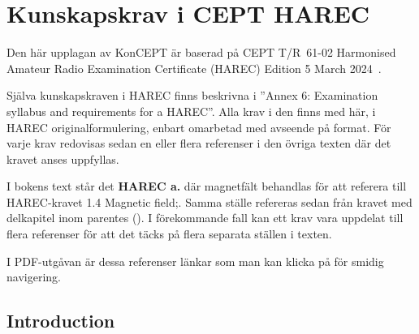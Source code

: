 \chapter{Kunskapskrav i CEPT HAREC}
\label{CEPT HAREC}

\noindent
Den här upplagan av KonCEPT är baserad på CEPT T/R~61-02 Harmonised Amateur
Radio Examination Certificate (HAREC) Edition 5 March 2024~\cite{TR6102}.

Själva kunskapskraven i HAREC finns beskrivna i
''Annex 6: Examination syllabus and requirements for a HAREC''.
Alla krav i den finns med här, i HAREC originalformulering, enbart omarbetad
med avseende på format.
För varje krav redovisas sedan en eller flera referenser i den övriga texten
där det kravet anses uppfyllas.

I bokens text står det \textbf{HAREC a.} där magnetfält
behandlas för att referera till HAREC-kravet 1.4 Magnetic field;.
Samma ställe refereras sedan från kravet med delkapitel inom parentes
().
I förekommande fall kan ett krav vara uppdelat till flera referenser för att
det täcks på flera separata ställen i texten.

I PDF-utgåvan är dessa referenser länkar som man kan klicka på för smidig
navigering.

\section{Introduction}

\makeatletter
\renewcommand{\theenumii}{\arabic{enumii}}
\renewcommand{\labelenumii}{\theenumi.\theenumii}
\renewcommand{\p@enumii}{\theenumi.}

\renewcommand{\theenumiii}{\arabic{enumiii}}
\renewcommand{\labelenumiii}{\theenumi.\theenumii.\theenumiii}
\renewcommand{\p@enumiii}{\theenumi.\theenumii.}
\makeatother

